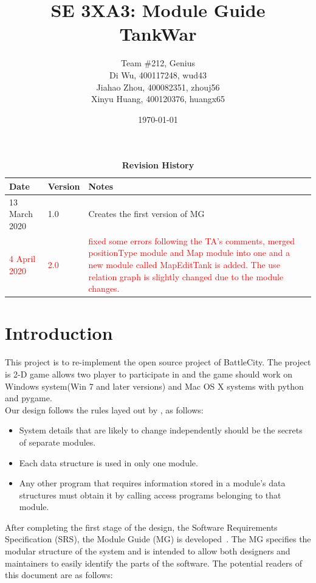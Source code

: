 \documentclass[12pt, titlepage]{article}
\title{SE 3XA3: Module Guide\\TankWar}
\author{Team \#212, Genius
		\\Di Wu, 400117248, wud43 
		\\Jiahao Zhou, 400082351, zhouj56 
		\\Xinyu Huang, 400120376, huangx65
}
\date{\today}
\begin{document}
\maketitle

\tableofcontents
\listoftables
\listoffigures

\begin{table}[bp]
\caption{\bf Revision History}
\begin{tabularx}{\textwidth}{p{3cm}p{2cm}X}
\toprule {\bf Date} & {\bf Version} & {\bf Notes}\\
\midrule
13 March 2020 & 1.0 & Creates the first version of MG\\
\textcolor{red}{4 April 2020} & \textcolor{red}{2.0} & \textcolor{red}{fixed some errors following the TA's comments, merged positionType module and Map module into one and a new module called MapEditTank is added. The use relation graph is slightly changed due to the module changes.}\\

\bottomrule
\end{tabularx}
\end{table}

\newpage


\section{Introduction}

This project is to re-implement the open source project of BattleCity. The project is 2-D game allows two player to participate in and the game should work on Windows system(Win 7 and later versions) and Mac OS X systems with python and pygame.\\
Our design follows the rules layed out by \citet{ParnasEtAl1984}, as follows:
\begin{itemize}
\item System details that are likely to change independently should be the
  secrets of separate modules.
\item Each data structure is used in only one module.
\item Any other program that requires information stored in a module's data
  structures must obtain it by calling access programs belonging to that module.
\end{itemize}

After completing the first stage of the design, the Software Requirements
Specification (SRS), the Module Guide (MG) is developed~\citep{ParnasEtAl1984}. The MG
specifies the modular structure of the system and is intended to allow both
designers and maintainers to easily identify the parts of the software.  The
potential readers of this document are as follows:
\end{document}
